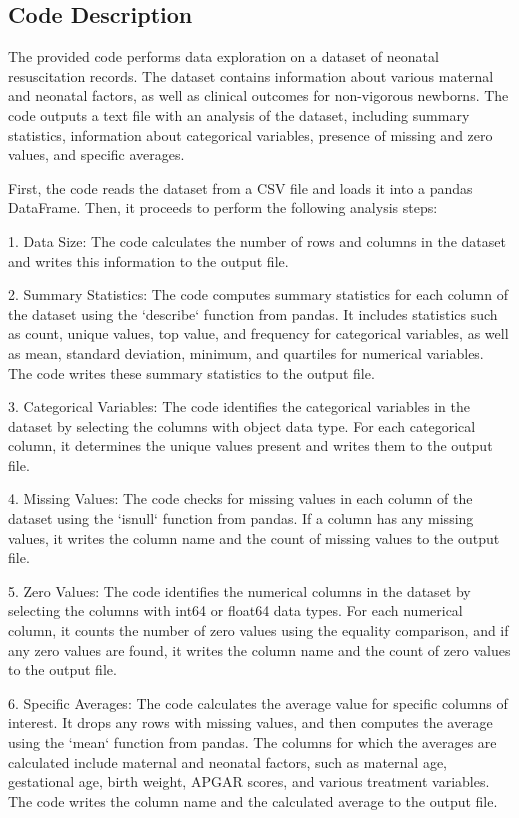 \documentclass[11pt]{article}
\begin{document}
\subsection{Code Description}

The provided code performs data exploration on a dataset of neonatal resuscitation records. The dataset contains information about various maternal and neonatal factors, as well as clinical outcomes for non-vigorous newborns. The code outputs a text file with an analysis of the dataset, including summary statistics, information about categorical variables, presence of missing and zero values, and specific averages.

First, the code reads the dataset from a CSV file and loads it into a pandas DataFrame. Then, it proceeds to perform the following analysis steps:

1. Data Size: The code calculates the number of rows and columns in the dataset and writes this information to the output file.

2. Summary Statistics: The code computes summary statistics for each column of the dataset using the `describe` function from pandas. It includes statistics such as count, unique values, top value, and frequency for categorical variables, as well as mean, standard deviation, minimum, and quartiles for numerical variables. The code writes these summary statistics to the output file.

3. Categorical Variables: The code identifies the categorical variables in the dataset by selecting the columns with object data type. For each categorical column, it determines the unique values present and writes them to the output file.

4. Missing Values: The code checks for missing values in each column of the dataset using the `isnull` function from pandas. If a column has any missing values, it writes the column name and the count of missing values to the output file.

5. Zero Values: The code identifies the numerical columns in the dataset by selecting the columns with int64 or float64 data types. For each numerical column, it counts the number of zero values using the equality comparison, and if any zero values are found, it writes the column name and the count of zero values to the output file.

6. Specific Averages: The code calculates the average value for specific columns of interest. It drops any rows with missing values, and then computes the average using the `mean` function from pandas. The columns for which the averages are calculated include maternal and neonatal factors, such as maternal age, gestational age, birth weight, APGAR scores, and various treatment variables. The code writes the column name and the calculated average to the output file.
\end{document}
